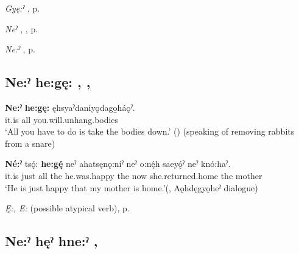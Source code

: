 \begin{CayugaRelated}
\item \textit{Gyę:ˀ} , p. \pageref{p:[gyę:ˀ]}\\
\item \textit{Neˀ} , , p. \pageref{p:[neˀ]}\\
\item \textit{Ne:ˀ} , p. \pageref{p:[ne:ˀ] `it is’}
\end{CayugaRelated}

\subsection*{\textbf{Ne:ˀ he:gę:} , , } \label{p:[ne:ˀ he:gę:]}

\ea
\label{ex:npar73}
\gll \textbf{Ne:ˀ} \textbf{he:gę:} ęhsyaˀdaniyǫdago̱háǫˀ.\\
it.is all you.will.unhang.bodies\\
\glt ‘All you have to do is take the bodies down.’ (\cite{henry_de_2005}) (speaking of removing rabbits from a snare)
\z

\ea
\label{ex:npar74}
\gll \textbf{Né:ˀ} tsǫ́: \textbf{he:gę́} neˀ ahatsęnǫ:níˀ neˀ o:nę́h saeyǫ́ˀ neˀ knó:haˀ.\\
it.is just all the he.was.happy the now she.returned.home the mother\\
\glt ‘He is just happy that my mother is home.’(\cite[508]{mithun_watewayestanih_1984}, Aǫhdęgyǫheˀ dialogue)
\z

\begin{CayugaRelated}
\item \textit{Ę:, E:} (possible atypical verb), p. \pageref{p:[ę:, e:] `atypical verb’}
\end{CayugaRelated}

\subsection*{\textbf{Ne:ˀ hęˀ hne:ˀ} , } \label{p:[ne:ˀ hęˀ hne:ˀ]}


